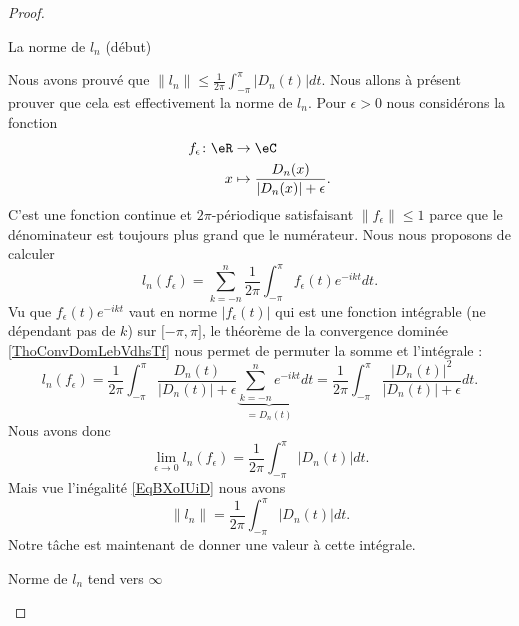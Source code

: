 \begin{proof}
\begin{subproof}
        \item[La norme de \( l_n\) (début)]

            Nous avons prouvé que \( \| l_n \|\leq \frac{1}{ 2\pi }\int_{-\pi}^{\pi}| D_n(t) |dt\). Nous allons à présent prouver que cela est effectivement la norme de \( l_n\). Pour \( \epsilon>0\) nous considérons la fonction
            \begin{equation}
                \begin{aligned}
                    f_{\epsilon}\colon \eR&\to \eC \\
                    x&\mapsto \frac{ D_n(x) }{ | D_n(x) |+\epsilon }. 
                \end{aligned}
            \end{equation}
            C'est une fonction continue et \( 2\pi\)-périodique satisfaisant \( \| f_{\epsilon} \|\leq 1\) parce que le dénominateur est toujours plus grand que le numérateur. Nous nous proposons de calculer
            \begin{equation}
                l_n(f_{\epsilon})=\sum_{k=-n}^n\frac{1}{ 2\pi }\int_{-\pi}^{\pi}f_{\epsilon}(t) e^{-ikt}dt.
            \end{equation}
            Vu que \( f_{\epsilon}(t) e^{-ikt}\) vaut en norme \( | f_{\epsilon}(t) |\) qui est une fonction intégrable (ne dépendant pas de \( k\)) sur \( \mathopen[ -\pi , \pi \mathclose]\), le théorème de la convergence dominée \ref{ThoConvDomLebVdhsTf} nous permet de permuter la somme et l'intégrale :
            \begin{equation}
                l_n(f_{\epsilon})=\frac{1}{ 2\pi }\int_{-\pi}^{\pi}\frac{ D_n(t) }{ | D_n(t) |+\epsilon }\underbrace{\sum_{k=-n}^n e^{-ikt}}_{=D_n(t)}dt=\frac{1}{ 2\pi }\int_{-\pi}^{\pi}\frac{ \big| D_n(t) \big|^2 }{ | D_n(t) |+\epsilon }dt.
            \end{equation}
            Nous avons donc
            \begin{equation}
                \lim_{\epsilon\to 0}l_n(f_{\epsilon})=\frac{1}{ 2\pi }\int_{-\pi}^{\pi}| D_n(t) |dt.
            \end{equation}
            Mais vue l'inégalité \eqref{EqBXoIUiD} nous avons
            \begin{equation}
                \| l_n \|=\frac{1}{ 2\pi }\int_{-\pi}^{\pi}| D_n(t) |dt.
            \end{equation}
            Notre tâche est maintenant de donner une valeur à cette intégrale.

        \item[Norme de \( l_n\) tend vers \( \infty\)]


\end{subproof}
\end{proof}
